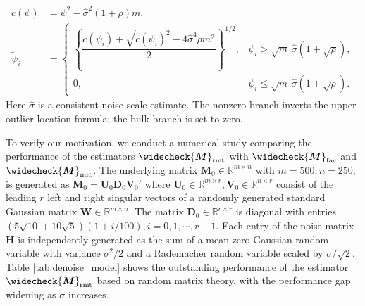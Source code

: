 \documentclass[numsec,webpdf,modern,large,namedate]{oup-authoring-template}
\theoremstyle{plain}
\theoremstyle{remark}
\newcommand{\M}{\bm{M}}
\newcommand{\bH}{\bm{H}}
\newcommand{\U}{\bm{U}}
\newcommand{\V}{\bm{V}}
\newif\ifmarkchanges
\newenvironment{revision}{\begingroup\ifmarkchanges\color{red}\fi}{\endgroup}
\begin{document}
\begin{revision}
\begin{align*}
 c(\psi)&=\psi^2-\widehat\sigma^2(1+\rho)m,\\
 \widetilde\psi_i&=
 \begin{cases}
 \left\{\dfrac{c(\psi_i)+
  \sqrt{c(\psi_i)^2-4\widehat\sigma^4\rho m^2}}{2}\right\}^{1/2},
 &\psi_i>\sqrt m\,\widehat\sigma(1+\sqrt\rho),\\[2mm]
 0,&\psi_i\le\sqrt m\,\widehat\sigma(1+\sqrt\rho).
 \end{cases}
\end{align*}
Here $\widehat\sigma$ is a consistent noise-scale estimate. The nonzero
branch inverts the upper-outlier location formula; the bulk branch is set
to zero.

\end{revision}


To verify our motivation, we conduct a numerical study comparing the performance of the estimators $\widecheck{\M}_{\text{rmt}}$ with $\widecheck{\M}_{\text{fac}}$ and $\widecheck{\M}_{\text{nuc}}$. The underlying matrix $\M_0\in \mathbb{R}^{m\times n}$ with $m=500,n=250$, is generated as $\M_0 = \U_0 \bm{D}_0 \V_0'$ where $\U_0\in \mathbb{R}^{m\times r},\V_0 \in \mathbb{R}^{n\times r}$ consist of the leading $r$ left and right singular vectors of a randomly generated standard Gaussian matrix $\bm{W}\in \mathbb{R}^{m\times n}$. The matrix $\bm{D}_0\in \mathbb{R}^{r\times r}$ is diagonal with entries $(5\sqrt{10}+10\sqrt{5})(1+i/100),i=0,1,\cdots,r-1$. Each entry of the noise matrix $\bH$ is independently generated as the sum of a mean-zero Gaussian random variable with variance $\sigma^2/2$ and a Rademacher random variable scaled by $\sigma/\sqrt{2}$. Table \ref{tab:denoise_model} shows the outstanding performance of the estimator $\widecheck{\M}_{\text{rmt}}$ based on random matrix theory, with the performance gap widening as $\sigma$ increases.
\end{document}
